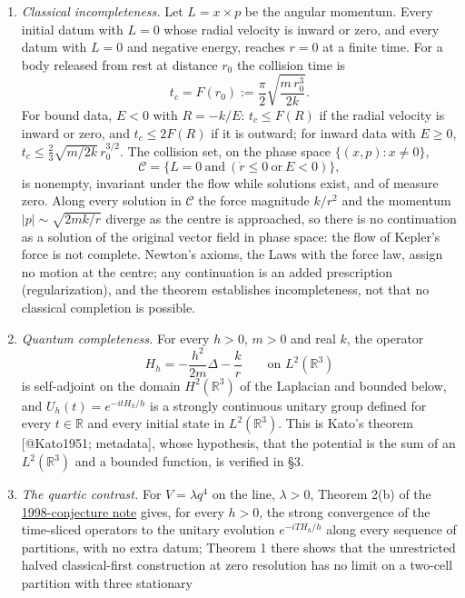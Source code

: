 \documentclass[11pt,a4paper]{article}
\begin{document}
\begin{enumerate}
\def\labelenumi{(\alph{enumi})}
\item
  \emph{Classical incompleteness.} Let \(L=x\times p\) be the angular
  momentum. Every initial datum with \(L=0\) whose radial velocity is
  inward or zero, and every datum with \(L=0\) and negative energy,
  reaches \(r=0\) at a finite time. For a body released from rest at
  distance \(r_0\) the collision time is
  \[t_c=F(r_0):=\frac\pi2\sqrt{\frac{m\,r_0^3}{2k}}.\tag{1}\] For bound
  data, \(E<0\) with \(R=-k/E\): \(t_c\le F(R)\) if the radial velocity
  is inward or zero, and \(t_c\le2F(R)\) if it is outward; for inward
  data with \(E\ge0\), \(t_c\le\tfrac23\sqrt{m/2k}\,r_0^{3/2}\). The
  collision set, on the phase space \(\{(x,p):x\neq0\}\),
  \[\mathcal C=\{L=0\ \text{and}\ (\dot r\le0\ \text{or}\ E<0)\},\] is
  nonempty, invariant under the flow while solutions exist, and of
  measure zero. Along every solution in \(\mathcal C\) the force
  magnitude \(k/r^2\) and the momentum \(|p|\sim\sqrt{2mk/r}\) diverge
  as the centre is approached, so there is no continuation as a solution
  of the original vector field in phase space: the flow of Kepler's
  force is not complete. Newton's axioms, the Laws with the force law,
  assign no motion at the centre; any continuation is an added
  prescription (regularization), and the theorem establishes
  incompleteness, not that no classical completion is possible.
\item
  \emph{Quantum completeness.} For every \(h>0\), \(m>0\) and real
  \(k\), the operator
  \[H_h=-\frac{h^2}{2m}\Delta-\frac kr\qquad\text{on }L^2(\mathbb R^3)\tag{2}\]
  is self-adjoint on the domain \(H^2(\mathbb R^3)\) of the Laplacian
  and bounded below, and \(U_h(t)=e^{-itH_h/h}\) is a strongly
  continuous unitary group defined for every \(t\in\mathbb R\) and every
  initial state in \(L^2(\mathbb R^3)\). This is Kato's theorem
  {[}@Kato1951; metadata{]}, whose hypothesis, that the potential is the
  sum of an \(L^2(\mathbb R^3)\) and a bounded function, is verified in
  §3.
\item
  \emph{The quartic contrast.} For \(V=\lambda q^4\) on the line,
  \(\lambda>0\), Theorem 2(b) of the
  \href{rivero-1998-conjecture-central-forces.md}{1998-conjecture note}
  gives, for every \(h>0\), the strong convergence of the time-sliced
  operators to the unitary evolution \(e^{-iTH_h/h}\) along every
  sequence of partitions, with no extra datum; Theorem 1 there shows
  that the unrestricted halved classical-first construction at zero
  resolution has no limit on a two-cell partition with three stationary

\end{enumerate}
\end{document}
